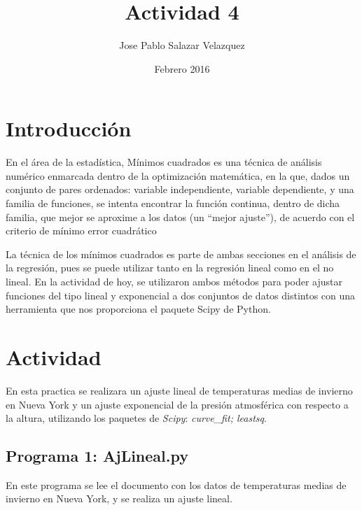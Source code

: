 \documentclass[12pt]{article}
\title{Actividad 4}
\author{Jose Pablo Salazar Velazquez}
\date{Febrero 2016}
\begin{document}
\maketitle

\section{Introducción}
En el área de la estadística, Mínimos cuadrados es una técnica de análisis numérico enmarcada dentro de la optimización matemática, en la que, dados un conjunto de pares ordenados: variable independiente, variable dependiente, y una familia de funciones, se intenta encontrar la función continua, dentro de dicha familia, que mejor se aproxime a los datos (un ``mejor ajuste''), de acuerdo con el criterio de mínimo error cuadrático 

La técnica de los mínimos cuadrados es parte de ambas secciones en el análisis de la regresión, pues se puede utilizar tanto en la regresión lineal como en el no lineal. En la actividad de hoy, se utilizaron ambos métodos para poder ajustar funciones del tipo lineal y exponencial a dos conjuntos de datos distintos con una herramienta que nos proporciona el paquete Scipy de Python.\\



\section{Actividad}
En esta practica se realizara un ajuste lineal de temperaturas medias de invierno en Nueva York y un ajuste exponencial de la presión atmosférica con respecto a la altura, utilizando los paquetes de \textit{Scipy}: \textit{curve\_fit; leastsq}.\\

\subsection{Programa 1: AjLineal.py}
En este programa se lee el documento con los datos de temperaturas medias de invierno en Nueva York, y se realiza un ajuste lineal.
\pagebreak
\end{document}
